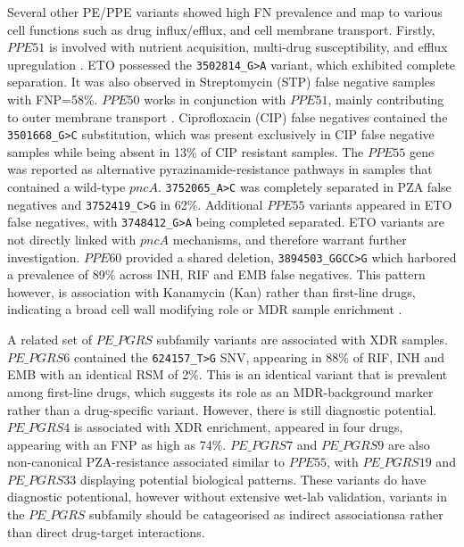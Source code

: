 Several other PE/PPE variants showed high FN prevalence and map to various cell functions such as drug influx/efflux, and cell membrane transport. Firstly, $PPE51$ is involved with nutrient acquisition, multi-drug susceptibility, and efflux upregulation \cite{Dechowetal2022, KoryckaMachalaetal2020}. ETO possessed the \texttt{3502814\_G>A} variant, which exhibited complete separation. It was also observed in Streptomycin (STP) false negative samples with FNP=58\%. $PPE50$ works in conjunction with $PPE51$, mainly contributing to outer membrane transport \cite{Guoetal2022}. Ciprofloxacin (CIP) false negatives contained the \texttt{3501668\_G>C} substitution, which was present exclusively in CIP false negative samples while being absent in 13\% of CIP resistant samples. The $PPE55$ gene was reported as alternative pyrazinamide-resistance pathways in samples that contained a wild-type $pncA$. \texttt{3752065\_A>C} was completely separated in PZA false negatives and \texttt{3752419\_C>G} in 62\%. Additional $PPE55$ variants appeared in ETO false negatives, with \texttt{3748412\_G>A} being completed separated. ETO variants are not directly linked with $pncA$ mechanisms, and therefore warrant further investigation. $PPE60$ provided a shared deletion, \texttt{3894503\_GGCC>G} which harbored a prevalence of 89\% across INH, RIF and EMB false negatives. This pattern however, is association with Kanamycin (Kan) rather than first-line drugs, indicating a broad cell wall modifying role or MDR sample enrichment \cite{Suetal2018}.  

A related set of $PE\_PGRS$ subfamily variants are associated with XDR samples. $PE\_PGRS6$ contained the \texttt{624157\_T>G} SNV, appearing in 88\% of RIF, INH and EMB with an identical RSM of 2\%. This is an identical variant that is prevalent among first-line drugs, which suggests its role as an MDR-background marker rather than a drug-specific variant. However, there is still diagnostic potential. $PE\_PGRS4$ is associated with XDR enrichment, appeared in four drugs, appearing with an FNP as high as 74\%. $PE\_PGRS7$ and $PE\_PGRS9$ are also non-canonical PZA-resistance associated similar to $PPE55$, with $PE\_PGRS19$ and $PE\_PGRS33$ displaying potential biological patterns. These variants do have diagnostic potentional, however without extensive wet-lab validation, variants in the $PE\_PGRS$ subfamily should be catageorised as indirect associationsa rather than direct drug-target interactions. 

